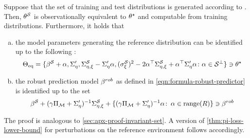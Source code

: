 \begin{proposition}
\label{prop:invariant-set-general} Suppose that the set of training and test distributions is generated according to .
Then, $\theta^{\mathcal{S}}$ is observationally equivalent
to $\theta^{\star}$ and computable from training distributions.
Furthermore, it holds that
\begin{enumerate}[(a)]
 \item %
 the model parameters %
 generating the reference distribution can be identified up to the following \idset: 
\begin{align*}
   \Theta_{\mathrm{eq}} = \{ \beta^{\mathcal{S}} + \alpha, \Sigma_{\eta}', \Sigma^{\mathcal{S}}_{\eta,\xi} - \Sigma_{\eta}' \alpha, ({\sigma_\xi^{\mathcal{S}}})^2 - 2 \alpha^\top \Sigma^{\mathcal{S}}_{\eta,\xi} + \alpha^\top \Sigma_{\eta}' \alpha \colon \alpha \in \mathcal{S}^\perp \}  \ni \theta^{\star} 
\end{align*}
\item %
the robust prediction model $\beta^{rob}$ as defined in \cref{eqn:formula-robust-predictor} is identified up to the set
    \begin{align*}
      \beta^{\mathcal{S}} + (\gamma \Pi_{\mathcal{M}} + \Sigma_{\eta}')^{-1} \Sigma^{\mathcal{S}}_{\eta,\xi} + \{ (\gamma \Pi_{\mathcal{M}} + \Sigma_{\eta}')^{-1} \alpha\colon \, \alpha \in \mathrm{range}(R)  \} \ni \beta^{rob} 
    \end{align*}
\end{enumerate}
\end{proposition}
The proof is analogous to \cref{sec:apx-proof-invariant-set}. A version of \cref{thm:pi-loss-lower-bound} for perturbations on the reference environment follows accordingly. 



